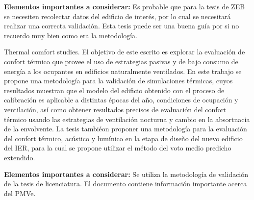 \textbf{Elementos importantes a considerar:} Es probable que para la tesis de ZEB se necesiten recolectar datos del edificio de interés, por lo cual se necesitará realizar una correcta validación. Esta tesis puede ser una buena guía por si no recuerdo muy bien como era la metodología. 


Thermal comfort studies.  El objetivo de este escrito es explorar la evaluación de confort térmico que provee el uso de estrategias pasivas y de bajo consumo de energía a los ocupantes en edificios naturalmente ventilados. En este trabajo se propone una metodología para la validación de simulaciones térmicas, cuyos resultados  muestran que el modelo del edificio obtenido con el proceso de calibración es aplicable a distintas épocas del año, condiciones de ocupación y ventilación, así como obtener resultados precisos de evaluación del confort térmico usando las estrategias de ventilación nocturna y cambio en la absortnacia de la envolvente. La tesis tambiéon proponer una metodología para la evaluación del confort térmico, acústico y lumínico en la etapa de diseño del nuevo edificio del IER, para la cual se propone utilizar el método del voto medio predicho extendido.


\textbf{Elementos importantes a considerar:} Se utiliza la metodología de validación de la tesis de licenciatura. El documento contiene información importante acerca del PMVe.




